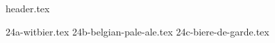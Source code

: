 \clearpage
{}
\divisorLine
{header.tex}
\begin{multicols}{2}
{24a-witbier.tex}
{24b-belgian-pale-ale.tex}
{24c-biere-de-garde.tex}
\end{multicols}